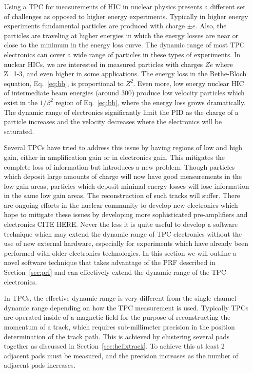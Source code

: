 Using a TPC for measurements of HIC in nuclear physics presents a different set of challenges as opposed to higher energy experiments. Typically in higher energy experiments fundamental particles are produced with charge $\pm e$. Also, the particles are traveling at higher energies in which the energy losses are near or close to the minimum in the energy loss curve. The dynamic range of most TPC electronics can cover a wide range of particles in these types of experiments. In nuclear HICs, we are interested in measured particles with charges $Ze$ where Z=1-3, and even higher in some applications. The energy loss in the Bethe-Bloch equation, Eq.~\ref{eq:bb}, is proportional to $Z^2$. Even more, low energy nuclear HIC of intermediate beam energies (around \SI{300}{\MeVA}) produce low velocity particles which exist in the $1/\beta^2$ region of Eq.~\ref{eq:bb}, where the energy loss grows dramatically. The dynamic range of electronics significantly limit the PID as the charge of a particle increases and the velocity decreases where the electronics will be saturated.

Several TPCs have tried to address this issue by having regions of low and high gain, either in amplification gain or in electronics gain. This mitigates the complete loss of information but introduces a new problem. Though particles which deposit large amounts of charge will now have good measurements in the low gain areas, particles which deposit minimal energy losses will lose information in the same low gain areas. The reconstruction of such tracks will suffer. There are ongoing efforts in the nuclear community to develop new electronics which hope to mitigate these issues by developing more sophisticated  pre-amplifiers and electronics CITE HERE.  Never the less it is quite useful to develop a software technique which may extend the dynamic range of TPC electronics without the use of new external hardware, especially for experiments which have already been performed with older electronics technologies. In this section we will outline a novel software technique that takes advantage of the PRF described in Section~\ref{sec:prf} and can effectively extend the dynamic range of the TPC electronics. 

In TPCs, the effective dynamic range is very different from the single channel dynamic range depending on how the TPC measurement is used. Typically TPCs are operated inside of a magnetic field for the purpose of reconstructing the momentum of a track, which requires sub-millimeter precision in the position determination of the track path. This is achieved by clustering several pads together as discussed in Section~\ref{sec:helixtrack}. To achieve this at least 2 adjacent pads must be measured, and the precision increases as the number of adjacent pads increases. 

